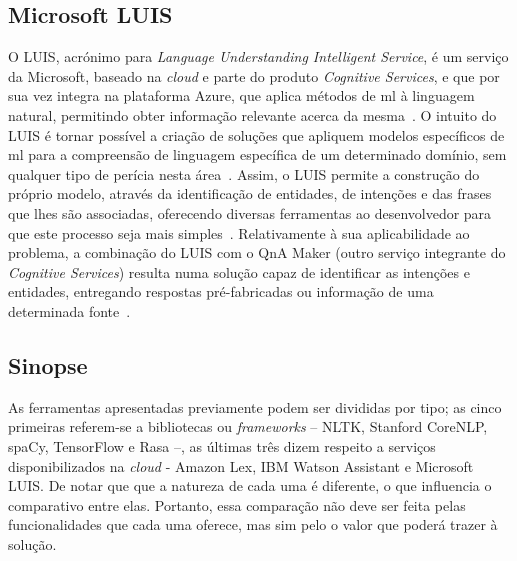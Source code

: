 \subsection{Microsoft LUIS}
O LUIS, acrónimo para \textit{Language Understanding Intelligent Service}, é um serviço da Microsoft, baseado na \textit{cloud} e parte do produto \textit{Cognitive Services}, e que por sua vez integra na plataforma Azure, que aplica métodos de \gls{ml} à linguagem natural, permitindo obter informação relevante acerca da mesma~\parencite{microsoft_luis_official}. O intuito do LUIS é tornar possível a criação de soluções que apliquem modelos específicos de \gls{ml} para a compreensão de linguagem específica de um determinado domínio, sem qualquer tipo de perícia nesta área~\parencite{luis_fast_easy_language_understanding}. Assim, o LUIS permite a construção do próprio modelo, através da identificação de entidades, de intenções e das frases que lhes são associadas, oferecendo diversas ferramentas ao desenvolvedor para que este processo seja mais simples~\parencite{microsoft_luis_official}. Relativamente à sua aplicabilidade ao problema, a combinação do LUIS com o QnA Maker (outro serviço integrante do \textit{Cognitive Services}) resulta numa solução capaz de identificar as intenções e entidades, entregando respostas pré-fabricadas ou informação de uma determinada fonte~\parencite{microsoft_luis_use_nl_processing_service}.

\subsection{Sinopse}
As ferramentas apresentadas previamente podem ser divididas por tipo; as cinco primeiras referem-se a bibliotecas ou \textit{frameworks} -- NLTK, Stanford CoreNLP, spaCy, TensorFlow e Rasa --, as últimas três dizem respeito a serviços disponibilizados na \textit{cloud} - Amazon Lex, IBM Watson Assistant e Microsoft LUIS. De notar que que a natureza de cada uma é diferente, o que influencia o comparativo entre elas. Portanto, essa comparação não deve ser feita pelas funcionalidades que cada uma oferece, mas sim pelo o valor que poderá trazer à solução.

